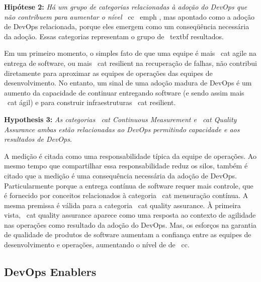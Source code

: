 \begin{mh}
\textbf{Hipótese 2:} \textit{Há um grupo de categorias relacionadas à adoção do DevOps
que não contribuem para aumentar o nível} \ cc \ emph {, mas
apontado como a adoção de DevOps relacionada, porque eles emergem como um
conseqüência necessária da adoção. Essas categorias representam o grupo de
\ textbf {resultados}}.
\end{mh}

Em um primeiro momento, o simples fato de que uma equipe é mais
\ cat {agile} na entrega de software, ou mais \ cat {resilient} na recuperação de falhas, não
contribui diretamente para aproximar as equipes de operações das equipes de desenvolvimento.
No entanto, um sinal de uma adoção madura de DevOps é um aumento da capacidade de continuar
entregando software (e sendo assim mais \ cat {ágil})
e para construir infraestruturas \ cat {resilient}.

\begin{mh}
\textbf{Hypothesis 3:} \textit{As categorias \ cat {Continuous Measurement} e \ cat {Quality Assurance}
ambas estão relacionadas ao DevOps permitindo capacidade e aos resultados de DevOps}.
\end{mh}

A medição é citada como uma responsabilidade típica da equipe de operações.
Ao mesmo tempo que compartilhar essa responsabilidade reduz os silos,
também é citado que a medição é uma consequência necessária da adoção de DevOps. Particularmente porque
a entrega contínua de software requer mais controle,
que é fornecido por conceitos relacionados à categoria \ cat {mensuração contínua}.
A mesma premissa é válida para a categoria \ cat {quality assurance}. À primeira vista,
\ cat {quality assurance} aparece como uma resposta ao contexto de agilidade nas operações
como resultado da adoção do DevOps. Mas, os esforços na garantia de qualidade de produtos de software
aumentam a confiança entre as equipes de desenvolvimento e operações, aumentando o nível de
de \ cc.

\subsection{DevOps Enablers}

